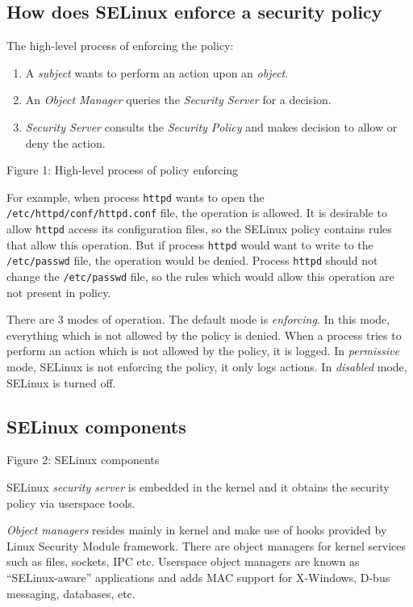 \subsection{How does SELinux enforce a security policy}
The high-level process of enforcing the policy:
\begin{enumerate}
    \item A \emph{subject} wants to perform an action upon an \emph{object}.
    \item An \emph{Object Manager} queries the \emph{Security Server} for a
    decision.
    \item \emph{Security Server} consults the \emph{Security Policy}
    and makes decision to allow or deny the action.
\end{enumerate}

Figure 1: High-level process of policy enforcing

For example, when process \texttt{httpd} wants to open the
\texttt{/etc/httpd/conf/httpd.conf} file, the operation is allowed. It is
desirable to allow \texttt{httpd} access its configuration files, so the SELinux
policy contains rules that allow this operation. But if process \texttt{httpd}
would want to write to the \texttt{/etc/passwd} file, the operation would be
denied. Process \texttt{httpd} should not change the \texttt{/etc/passwd} file,
so the rules which would allow this operation are not present in policy.

There are 3 modes of operation. The default mode is \emph{enforcing}. In this
mode, everything which is not allowed by the policy is denied. When a process
tries to perform an action which is not allowed by the policy, it is logged. In
\emph{permissive} mode, SELinux is not enforcing the policy, it only logs
actions. In \emph{disabled} mode, SELinux is turned off.

\subsection{SELinux components}
Figure 2: SELinux components

SELinux \emph{security server} is embedded in the kernel and it obtains the
security policy via userspace tools.

\emph{Object managers} resides mainly in kernel and make use of hooks provided
by Linux Security Module framework. There are object managers for kernel
services such as files, sockets, IPC etc. Userspace object managers are known as
``SELinux-aware'' applications and adds MAC support for X-Windows, D-bus
messaging, databases, etc.

